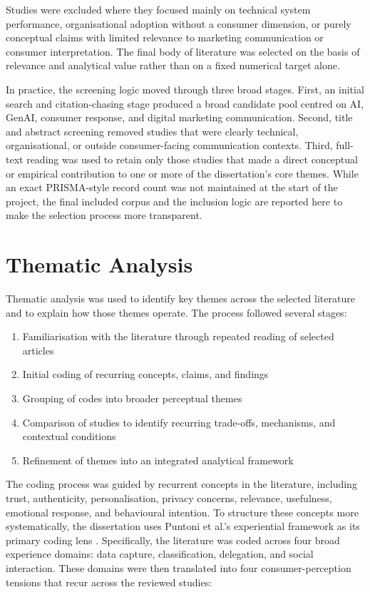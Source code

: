 Studies were excluded where they focused mainly on technical system performance, organisational adoption without a consumer dimension, or purely conceptual claims with limited relevance to marketing communication or consumer interpretation. The final body of literature was selected on the basis of relevance and analytical value rather than on a fixed numerical target alone.

In practice, the screening logic moved through three broad stages. First, an initial search and citation-chasing stage produced a broad candidate pool centred on AI, GenAI, consumer response, and digital marketing communication. Second, title and abstract screening removed studies that were clearly technical, organisational, or outside consumer-facing communication contexts. Third, full-text reading was used to retain only those studies that made a direct conceptual or empirical contribution to one or more of the dissertation's core themes. While an exact PRISMA-style record count was not maintained at the start of the project, the final included corpus and the inclusion logic are reported here to make the selection process more transparent.

\section{Thematic Analysis}
Thematic analysis was used to identify key themes across the selected literature and to explain how those themes operate. The process followed several stages:

\begin{enumerate}
    \item Familiarisation with the literature through repeated reading of selected articles
    \item Initial coding of recurring concepts, claims, and findings
    \item Grouping of codes into broader perceptual themes
    \item Comparison of studies to identify recurring trade-offs, mechanisms, and contextual conditions
    \item Refinement of themes into an integrated analytical framework
\end{enumerate}

The coding process was guided by recurrent concepts in the literature, including trust, authenticity, personalisation, privacy concerns, relevance, usefulness, emotional response, and behavioural intention. To structure these concepts more systematically, the dissertation uses Puntoni et al.'s experiential framework as its primary coding lens \cite{puntoni2021experiential}. Specifically, the literature was coded across four broad experience domains: data capture, classification, delegation, and social interaction. These domains were then translated into four consumer-perception tensions that recur across the reviewed studies:

